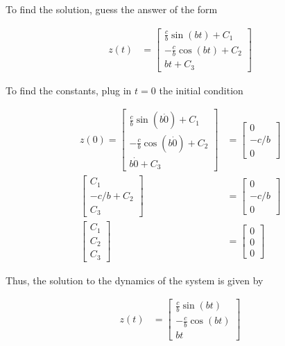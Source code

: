 \documentclass[11pt]{article}
\theoremstyle{definition}
\begin{document}
\begin{enumerate}
\begin{enumerate}
        To find the solution, guess the answer of the form

        \begin{align}
            z(t) &= \begin{bmatrix} \frac{c}{b} \sin(bt) + C_1 \\ -\frac{c}{b} \cos(bt) + C_2 \\ bt + C_3 \end{bmatrix}
        \end{align}       

        To find the constants, plug in $t = 0$ the initial condition

        \begin{align}
            z(0) = \begin{bmatrix} \frac{c}{b} \sin(b \dot 0) + C_1 \\ -\frac{c}{b} \cos(b \dot 0) + C_2 \\ b \dot 0 + C_3 \end{bmatrix} &= \begin{bmatrix} 0 \\ -c/b \\ 0 \end{bmatrix} \\
            \begin{bmatrix} C_1 \\ -c/b + C_2 \\ C_3 \end{bmatrix} &= \begin{bmatrix} 0 \\ -c/b \\ 0 \end{bmatrix} \\
            \begin{bmatrix} C_1 \\ C_2 \\ C_3 \end{bmatrix} &= \begin{bmatrix} 0 \\ 0 \\ 0 \end{bmatrix}
        \end{align}

        Thus, the solution to the dynamics of the system is given by

        \begin{align}
            z(t) &= \begin{bmatrix} \frac{c}{b} \sin(bt) \\ -\frac{c}{b} \cos(bt) \\ bt \end{bmatrix}
        \end{align} 


\end{enumerate}
\end{enumerate}
\end{document}
